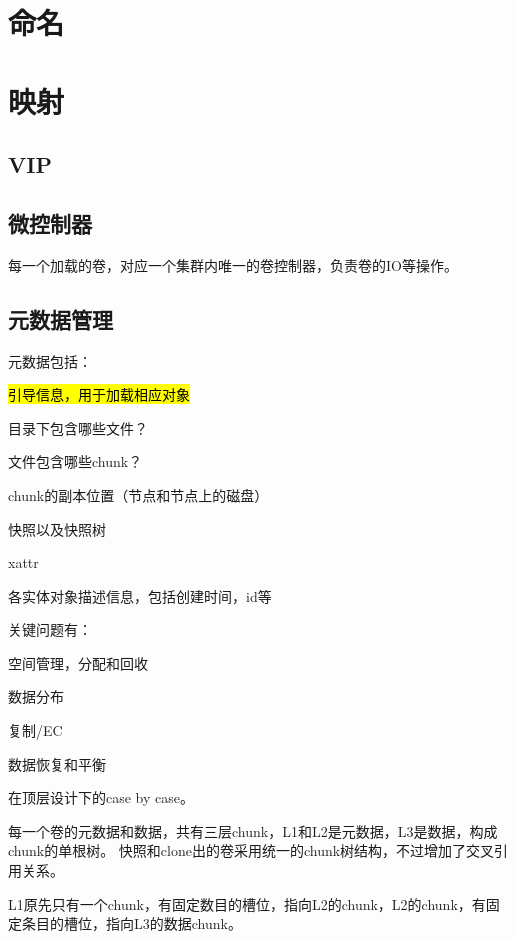 \section{命名}

\section{映射}

\subsection{VIP}

\subsection{微控制器}

每一个加载的卷，对应一个集群内唯一的卷控制器，负责卷的IO等操作。

\subsection{元数据管理}

元数据包括：
\begin{enumbox}
\item \hl{引导信息，用于加载相应对象}
\item 目录下包含哪些文件？
\item 文件包含哪些chunk？
\item chunk的副本位置（节点和节点上的磁盘）
\item 快照以及快照树
\item xattr
\item 各实体对象描述信息，包括创建时间，id等
\end{enumbox}

关键问题有：
\begin{enumbox}
\item 空间管理，分配和回收
\item 数据分布
\item 复制/EC
\item 数据恢复和平衡
\end{enumbox}

在顶层设计下的case by case。

每一个卷的元数据和数据，共有三层chunk，L1和L2是元数据，L3是数据，构成chunk的单根树。
快照和clone出的卷采用统一的chunk树结构，不过增加了交叉引用关系。

L1原先只有一个chunk，有固定数目的槽位，指向L2的chunk，L2的chunk，有固定条目的槽位，指向L3的数据chunk。

